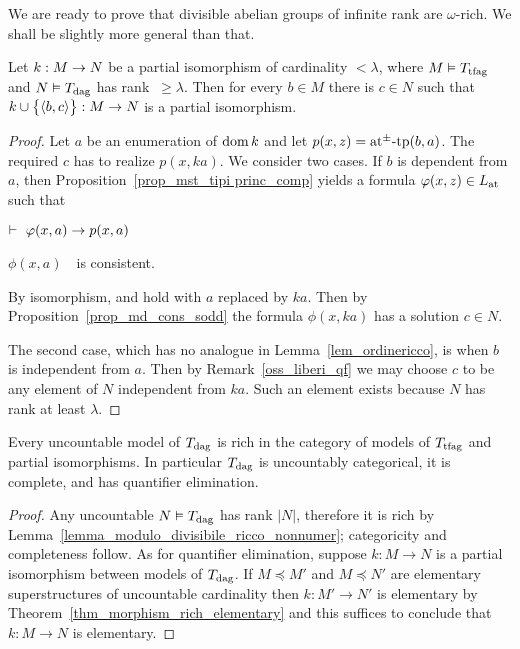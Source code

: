 \documentclass[creche.tex]{subfiles}
\begin{document}
We are ready to prove that divisible abelian groups of infinite rank are $\omega$-rich. We shall be slightly more general than that.

\begin{lemma}\label{lemma_modulo_divisibile_ricco_nonnumer}
Let $k:M\imp N$ be a partial isomorphism of cardinality $<\lambda$, where $M\models T_{\rm tfag}$ and $N\models T_{\rm dag}$ has rank $\ \ge\lambda$. Then for every $b\in M$ there is $c\in N$ such that $k\cup\big\{\<b,c\>\big\}:M\imp N$ is a partial isomorphism.
\end{lemma}

\begin{proof}
Let $a$ be an enumeration of $\dom k$ and let $p(x,z)=\atpmtp(b,a)$.  The required $c$ has to realize $p(x,ka)$. We consider two cases. If $b$ is dependent from $a$, then Proposition~\ref{prop_mst_tipi princ_comp} yields a formula $\phi(x,z)\in\atL$ such that 

\noindent{}\hspace{5ex} $\proves\ \phi(x,a)\imp p(x,a)$

\noindent{}\hspace{5ex} $\phi(x,a)$\ \ is consistent.

By isomorphism,   and  hold with $a$ replaced by $ka$. Then by Proposition~\ref{prop_md_cons_sodd} the formula $\phi(x,ka)$ has a solution $c \in N$.

The second case, which has no analogue in Lemma~\ref{lem_ordinericco}, is when $b$ is independent from $a$. Then by   Remark~\ref{oss_liberi_qf} we may choose $c$ to be any element of $N$ independent from $ka$. Such an element exists because $N$ has rank at least $\lambda$. 
\end{proof}

\begin{corollary}\label{corol_ModDivUltraOmog}
Every uncountable model of $T_{\rm dag}$ is rich in the category of models of $T_{\rm tfag}$ and partial isomorphisms. In particular $T_{\rm dag}$ is uncountably categorical, it is complete, and has quantifier elimination.
\end{corollary}
\begin{proof}
Any uncountable $N\models T_{\rm dag}$ has rank $|N|$, therefore it is rich by Lemma~\ref{lemma_modulo_divisibile_ricco_nonnumer}; categoricity and completeness follow. As for quantifier elimination, suppose $k:M\to N$ is a partial isomorphism between models of $T_{\rm dag}$. If $M\preceq M'$ and $M\preceq N'$ are elementary superstructures of uncountable cardinality then $k:M'\to N'$ is elementary by Theorem~\ref{thm_morphism_rich_elementary} and this suffices to conclude that  $k:M\to N$ is elementary. 
\end{proof}
\end{document}
